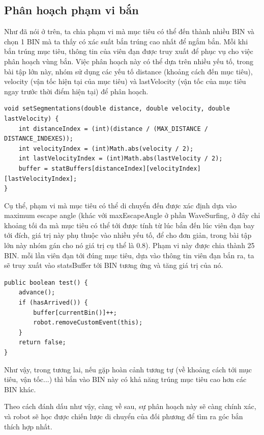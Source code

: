 \documentclass[14pt]{article}
\begin{document}
\subsection{Phân hoạch phạm vi bắn}
Như đã nói ở trên, ta chia phạm vi mà mục tiêu có thể đến thành nhiều BIN và chọn 1 BIN mà ta thấy có xác suất bắn trúng cao nhất để ngắm bắn.
Mỗi khi bắn trúng mục tiêu, thông tin của viên đạn được truy xuất để phục vụ cho việc phân hoạch vùng bắn. Việc phân hoạch này có thể dựa trên nhiều yếu tố, trong bài tập lớn này, nhóm sử dụng các yếu tố distance (khoảng cách đến mục tiêu), velocity (vận tốc hiện tại của mục tiêu) và lastVelocity (vận tốc của mục tiêu ngay trước thời điểm hiện tại) để phân hoạch.
\begin{lstlisting}[caption = Phân hoạch, frame = single]
void setSegmentations(double distance, double velocity, double lastVelocity) {
	int distanceIndex = (int)(distance / (MAX_DISTANCE / DISTANCE_INDEXES));
	int velocityIndex = (int)Math.abs(velocity / 2);
	int lastVelocityIndex = (int)Math.abs(lastVelocity / 2);
	buffer = statBuffers[distanceIndex][velocityIndex][lastVelocityIndex];
}
\end{lstlisting}
Cụ thể, phạm vi mà mục tiêu có thể di chuyển đến được xác định dựa vào maximum escape angle (khác với maxEscapeAngle ở phần WaveSurfing, ở đây chỉ khoảng tối đa mà mục tiêu có thể tới được tính từ lúc bắn đến lúc viên đạn bay tới đích, giá trị này phụ thuộc vào nhiều yếu tố, để cho đơn giản, trong bài tập lớn này nhóm gán cho nó giá trị cụ thể là 0.8). Phạm vi này được chia thành 25 BIN. mỗi lần viên đạn tới đúng mục tiêu, dựa vào thông tin viên đạn bắn ra, ta sẽ truy xuất vào statsBuffer tới BIN tương ứng và tăng giá trị của nó. 
\begin{lstlisting}[caption = test, frame = single]
public boolean test() {
	advance();
	if (hasArrived()) {
		buffer[currentBin()]++;
		robot.removeCustomEvent(this);
	}
	return false;
}
\end{lstlisting}
Như vậy, trong tương lai, nếu gặp hoàn cảnh tương tự (về khoảng cách tới mục tiêu, vận tốc...) thì bắn vào BIN này có khả năng trúng mục tiêu cao hơn các BIN khác.

Theo cách đánh dấu như vậy, càng về sau, sự phân hoạch này sẽ càng chính xác, và robot sẽ học được chiến lược di chuyển của đối phương để tìm ra góc bắn thích hợp nhất.
\end{document}
